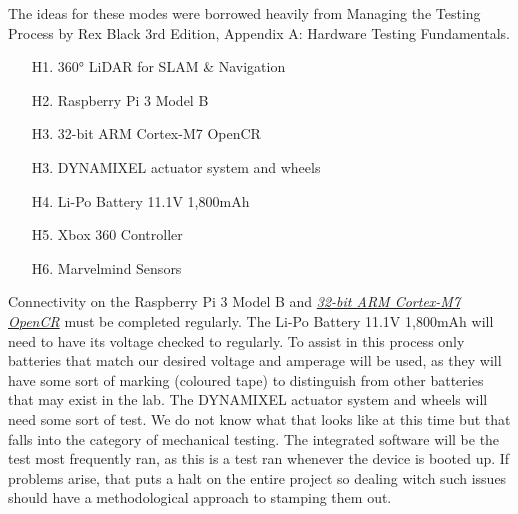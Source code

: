 \documentclass[english,12pt]{article}
\begin{document}
The ideas for these modes were borrowed heavily from Managing the Testing Process by Rex Black 3rd Edition, 
Appendix A: Hardware Testing Fundamentals. 
\begin{itemize}
\item[H1.] \ang{360} LiDAR for SLAM \& Navigation
\item[H2.] Raspberry Pi 3 Model B
\item[H3.] 32-bit ARM Cortex-M7 OpenCR
\item[H3.] DYNAMIXEL actuator system and wheels
\item[H4.] Li-Po Battery 11.1V 1,800mAh 
\item[H5.] Xbox 360 Controller 
\item[H6.] Marvelmind Sensors
\end{itemize}
Connectivity on the Raspberry Pi 3 Model B and 
\href{http://emanual.robotis.com/docs/en/parts/controller/opencr10/}{\textit{32-bit ARM Cortex-M7 OpenCR}} 
must be completed regularly. The Li-Po Battery 11.1V 1,800mAh will need to have its voltage checked to 
regularly. To assist in this process only batteries that match our desired voltage and amperage will be 
used, as they will have some sort of marking (coloured tape) to distinguish from other batteries that may 
exist in the lab. The DYNAMIXEL actuator system and wheels will need some sort of test. We do not know what 
that looks like at this time but that falls into the category of mechanical testing. The integrated software 
will be the test most frequently ran, as this is a test ran whenever the device is booted up. If problems arise, 
that puts a halt on the entire project so dealing witch such issues should have a methodological approach to stamping 
them out. 
\end{document}
